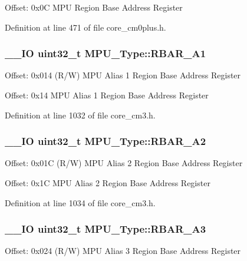 Offset\-: 0x0\-C M\-P\-U Region Base Address Register 

Definition at line 471 of file core\-\_\-cm0plus.\-h.

\hypertarget{struct_m_p_u___type_a4dbcffa0a71c31e521b645b34b40e639}{
\subsubsection[{R\-B\-A\-R\-\_\-\-A1}]{\setlength{\rightskip}{0pt plus 5cm}\-\_\-\-\_\-\-I\-O {\bf uint32\-\_\-t} M\-P\-U\-\_\-\-Type\-::\-R\-B\-A\-R\-\_\-\-A1}}\label{struct_m_p_u___type_a4dbcffa0a71c31e521b645b34b40e639}
Offset\-: 0x014 (R/\-W) M\-P\-U Alias 1 Region Base Address Register

Offset\-: 0x14 M\-P\-U Alias 1 Region Base Address Register 

Definition at line 1032 of file core\-\_\-cm3.\-h.

\hypertarget{struct_m_p_u___type_a8703a00626dba046b841c0db6c78c395}{
\subsubsection[{R\-B\-A\-R\-\_\-\-A2}]{\setlength{\rightskip}{0pt plus 5cm}\-\_\-\-\_\-\-I\-O {\bf uint32\-\_\-t} M\-P\-U\-\_\-\-Type\-::\-R\-B\-A\-R\-\_\-\-A2}}\label{struct_m_p_u___type_a8703a00626dba046b841c0db6c78c395}
Offset\-: 0x01\-C (R/\-W) M\-P\-U Alias 2 Region Base Address Register

Offset\-: 0x1\-C M\-P\-U Alias 2 Region Base Address Register 

Definition at line 1034 of file core\-\_\-cm3.\-h.

\hypertarget{struct_m_p_u___type_a9fda17c37b85ef317c7c8688ff8c5804}{
\subsubsection[{R\-B\-A\-R\-\_\-\-A3}]{\setlength{\rightskip}{0pt plus 5cm}\-\_\-\-\_\-\-I\-O {\bf uint32\-\_\-t} M\-P\-U\-\_\-\-Type\-::\-R\-B\-A\-R\-\_\-\-A3}}\label{struct_m_p_u___type_a9fda17c37b85ef317c7c8688ff8c5804}
Offset\-: 0x024 (R/\-W) M\-P\-U Alias 3 Region Base Address Register

